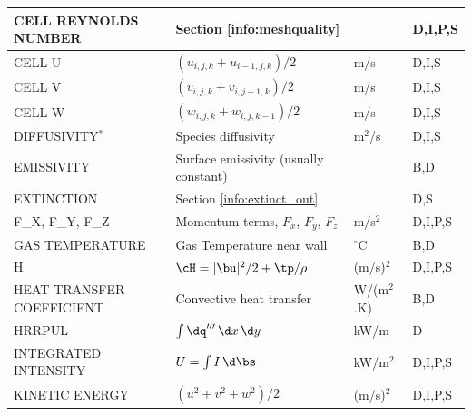 \documentclass[11pt]{book}
\begin{document}
\begin{longtable}{@{\extracolsep{\fill}}|l|l|l|l|}
{\ct CELL REYNOLDS NUMBER}                      & Section \ref{info:meshquality}                    &                & D,I,P,S      \\ \hline
{\ct CELL U}                                    & $(u_{i,j,k}+u_{i-1,j,k})/2$                       & m/s            & D,I,S        \\ \hline
{\ct CELL V}                                    & $(v_{i,j,k}+v_{i,j-1,k})/2$                       & m/s            & D,I,S        \\ \hline
{\ct CELL W}                                    & $(w_{i,j,k}+w_{i,j,k-1})/2$                       & m/s            & D,I,S        \\ \hline
{\ct DIFFUSIVITY}$^{*}$                         & Species diffusivity                        & m$^2$/s        & D,I,S        \\ \hline
{\ct EMISSIVITY}                                & Surface emissivity (usually constant)             &                & B,D          \\ \hline
{\ct EXTINCTION}                                & Section \ref{info:extinct_out}                    &                & D,S          \\ \hline
{\ct F\_X, F\_Y, F\_Z}                          & Momentum terms, $F_x$, $F_y$, $F_z$               & m/s$^2$        & D,I,P,S      \\ \hline
{\ct GAS TEMPERATURE}                           & Gas Temperature near wall                         & $^\circ$C      & B,D          \\ \hline
{\ct H}                                         & $\cH=|\bu|^2/2 + \tp/\rho    $                    & (m/s)$^2$      & D,I,P,S      \\ \hline
{\ct HEAT TRANSFER COEFFICIENT}                 & Convective heat transfer                          & \si{W/(m$^2$.K)} & B,D        \\ \hline
{\ct HRRPUL}                                    & $\int \dq''' \, \d x \, \d y$                     & kW/m           & D            \\ \hline
{\ct INTEGRATED INTENSITY}                      & $U=\int I \, \d \bs$                              & kW/m$^2$       & D,I,P,S      \\ \hline
{\ct KINETIC ENERGY}                            & $(u^2+v^2+w^2)/2$                                 & (m/s)$^2$      & D,I,P,S      \\ \hline

\end{longtable}
\end{document}
